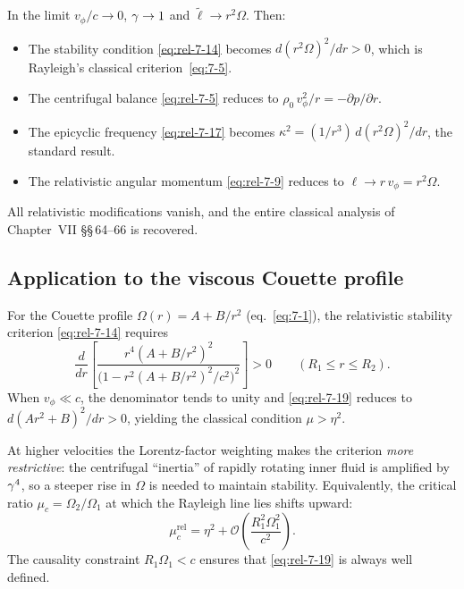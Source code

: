 In the limit $v_{\phi}/c\to 0$, $\gamma\to 1$ and
$\widetilde{\ell}\to r^{2}\Omega$.  Then:
\begin{itemize}
\item The stability condition \eqref{eq:rel-7-14} becomes
  $d(r^{2}\Omega)^{2}/dr>0$, which is Rayleigh's classical
  criterion~\eqref{eq:7-5}.
\item The centrifugal balance \eqref{eq:rel-7-5} reduces to
  $\rho_{0}\,v_{\phi}^{2}/r=-\partial p/\partial r$.
\item The epicyclic frequency \eqref{eq:rel-7-17} becomes
  $\kappa^{2}=(1/r^{3})\,d(r^{2}\Omega)^{2}/dr$, the standard
  result.
\item The relativistic angular momentum \eqref{eq:rel-7-9} reduces
  to $\ell\to r\,v_{\phi}=r^{2}\Omega$.
\end{itemize}
All relativistic modifications vanish, and the entire classical
analysis of Chapter~VII \S\S\,64--66 is recovered.

\subsection{Application to the viscous Couette profile}
\label{sec:rel-7-66e}

For the Couette profile $\Omega(r)=A+B/r^{2}$ (eq.~\eqref{eq:7-1}),
the relativistic stability criterion \eqref{eq:rel-7-14} requires
\begin{equation}
\label{eq:rel-7-19}
\frac{d}{dr}\!\left[\frac{r^{4}(A+B/r^{2})^{2}}
  {\bigl(1-r^{2}(A+B/r^{2})^{2}/c^{2}\bigr)^{2}}\right] > 0
\qquad (R_{1}\le r\le R_{2}).
\end{equation}
When $v_{\phi}\ll c$, the denominator tends to unity and
\eqref{eq:rel-7-19} reduces to $d(Ar^{2}+B)^{2}/dr>0$, yielding
the classical condition $\mu>\eta^{2}$.

At higher velocities the Lorentz-factor weighting makes the criterion
\emph{more restrictive}: the centrifugal ``inertia'' of rapidly
rotating inner fluid is amplified by $\gamma^{4}$, so a steeper rise
in $\Omega$ is needed to maintain stability.  Equivalently,
the critical ratio $\mu_{c}=\Omega_{2}/\Omega_{1}$ at which the
Rayleigh line lies shifts upward:
\begin{equation}
\label{eq:rel-7-20}
\mu_{c}^{\mathrm{rel}} = \eta^{2} + \mathcal{O}
  \!\left(\frac{R_{1}^{2}\Omega_{1}^{2}}{c^{2}}\right).
\end{equation}
The causality constraint $R_{1}\Omega_{1}<c$ ensures that
\eqref{eq:rel-7-19} is always well defined.

